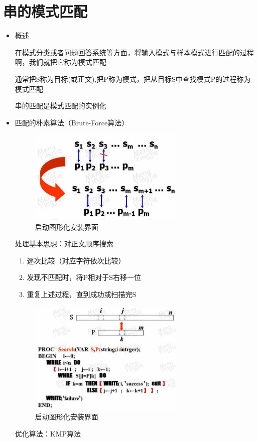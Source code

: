 \documentclass[AutoFakeBold]{LZUThesis2007}
\begin{document}
	\section{串的模式匹配}
		\begin{itemize}
			\item 概述

	在模式分类或者问题回答系统等方面，将输入模式与样本模式进行匹配的过程啊，我们就把它称为模式匹配
	
	通常把S称为目标(或正文),把P称为模式，把从目标S中查找模式P的过程称为模式匹配
	
	串的匹配是模式匹配的实例化

			\item 匹配的朴素算法（Brute-Force算法）
			\begin{figure}[H]
			    \centering
			    \includegraphics[width=0.7\textwidth]{figures/5.1.jpg}
			    \caption{启动图形化安装界面}
			    \label{fig_install_texlive}
			\end{figure}

			处理基本思想：对正文顺序搜索
				\begin{enumerate}
					\item 逐次比较（对应字符依次比较）
					\item 发现不匹配时，将P相对于S右移一位
					\item 重复上述过程，直到成功或扫描完S
				\end{enumerate}
			\begin{figure}[H]
			    \centering
			    \includegraphics[width=0.7\textwidth]{figures/5.2.jpg}
			    \caption{启动图形化安装界面}
			    \label{fig_install_texlive}
			\end{figure}

			优化算法：KMP算法
		\end{itemize}
\end{document}
